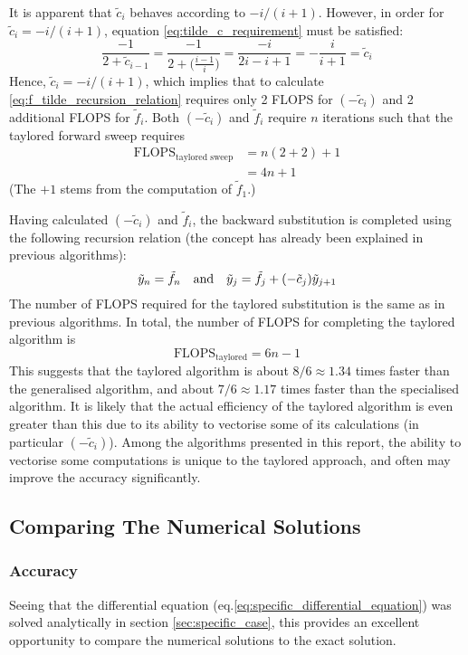 \documentclass[reprint,english]{revtex4-1}
\begin{document}
It is apparent that \(\tilde{c}_i\) behaves according to \(-i/(i+1)\). However, in order for \(\tilde{c}_i=-i/(i+1)\), equation \eqref{eq:tilde_c_requirement} must be satisfied:
\[\frac{-1}{2+\tilde{c}_{i-1}}=\frac{-1}{2+\big(\frac{i-1}{i}\big)}=\frac{-i}{2i-i+1}=-\frac{i}{i+1}=\tilde{c}_i\]
Hence, \(\tilde{c}_i=-i/(i+1)\), which implies that to calculate \eqref{eq:f_tilde_recursion_relation} requires only 2 FLOPS for \((-\tilde{c}_i)\) and 2 additional FLOPS for \(\tilde{f}_i\). Both \((-\tilde{c}_i)\) and \(\tilde{f}_i\) require \(n\) iterations such that the taylored forward sweep requires
\begin{align}
\text{FLOPS}_{\text{taylored sweep}}&=n(2+2)+1\nonumber\\
&=4n+1
\end{align}
(The \(+1\) stems from the computation of \(\tilde{f}_1\).)

Having calculated \((-\tilde{c}_i)\) and \(\tilde{f}_i\), the backward substitution is completed using the following recursion relation (the concept has already been explained in previous algorithms):
\begin{equation}
\tilde{y}_n=\tilde{f}_n\qand\tilde{y}_j=\tilde{f}_j+(-\tilde{c}_j)\tilde{y}_{j+1}
\end{equation}
The number of FLOPS required for the taylored substitution is the same as in previous algorithms. In total, the number of FLOPS for completing the taylored algorithm is
\begin{equation}
\text{FLOPS}_{\text{taylored}}=6n-1
\end{equation}
This suggests that the taylored algorithm is about \(8/6\approx1.34\) times faster than the generalised algorithm, and about \(7/6\approx1.17\) times faster than the specialised algorithm. It is likely that the actual efficiency of the taylored algorithm is even greater than this due to its ability to vectorise some of its calculations (in particular \((-\tilde{c}_i)\)). Among the algorithms presented in this report, the ability to vectorise some computations is unique to the taylored approach, and often may improve the accuracy significantly.
\newpage
\subsection{Comparing The Numerical Solutions}
\subsubsection{Accuracy}
Seeing that the differential equation (eq.\eqref{eq:specific_differential_equation}) was solved analytically in section \ref{sec:specific_case}, this provides an excellent opportunity to compare the numerical solutions to the exact solution.
\end{document}
